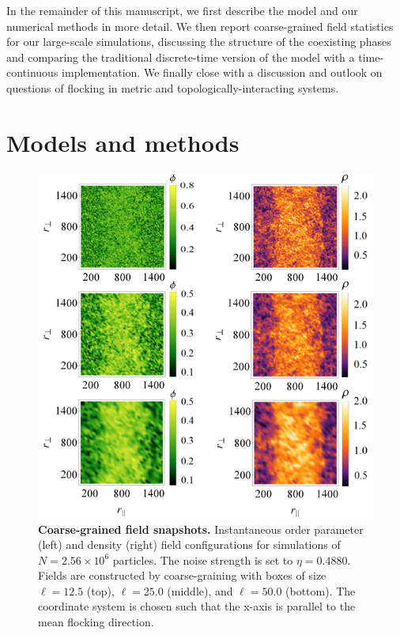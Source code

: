 \documentclass[twoside,twocolumn,9pt]{article}
\begin{document}
In the remainder of this manuscript, we first describe the model and our numerical methods in more detail.
We then report coarse-grained field statistics for our large-scale simulations, discussing the structure of the coexisting phases and comparing the traditional discrete-time version of the model with a time-continuous implementation.
We finally close with a discussion and outlook on questions of flocking in metric and topologically-interacting systems.


\section{Models and methods}

\begin{figure}[h]
	\centering
    \includegraphics[width=0.99\columnwidth]{CoarseGrainedFields.PNG}
    \caption{\textbf{Coarse-grained field snapshots.}
		Instantaneous order parameter (left) and density (right) field configurations for simulations of $N=2.56\times10^6$ particles. The noise strength is set to $\eta=0.4880$. Fields are constructed by coarse-graining with boxes of size $\ell=12.5$ (top), $\ell=25.0$ (middle),  and $\ell=50.0$ (bottom).
		The coordinate system is chosen such that the x-axis is parallel to the mean flocking direction.
	}
	\label{fig:CoarseGrainedFieldSnapshots}
\end{figure}
\end{document}
